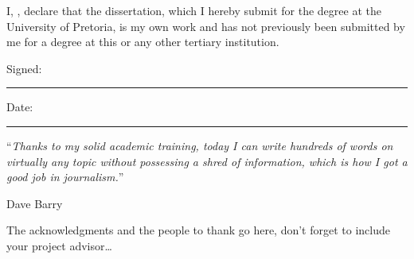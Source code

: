 \documentclass[
11pt, %
oneside, %
english, %
onehalfspacing, %
nolistspacing, %
parskip, %
headsepline, %
]{MastersDoctoralThesis} %
\begin{document}
\begin{declaration}
\addchaptertocentry{\authorshipname} %
\noindent I, \authorname, declare that the dissertation, which I hereby submit for the degree \textit{\degreename} at the University of Pretoria, is my own work and has not previously been submitted by me for a degree at this or any other tertiary institution.

\bigskip
\bigskip

\noindent Signed:\\
\rule[0.5em]{25em}{0.5pt} %
\bigskip

\noindent Date:\\
\rule[0.5em]{25em}{0.5pt} %
\end{declaration}

\cleardoublepage


\vspace*{0.2\textheight}

\noindent\enquote{\itshape Thanks to my solid academic training, today I can write hundreds of words on virtually any topic without possessing a shred of information, which is how I got a good job in journalism.}\bigbreak

\hfill Dave Barry


\begin{acknowledgements}
\addchaptertocentry{\acknowledgementname} %
The acknowledgments and the people to thank go here, don't forget to include your project advisor\ldots
\end{acknowledgements}


\tableofcontents %

\listoffigures %
\end{document}
